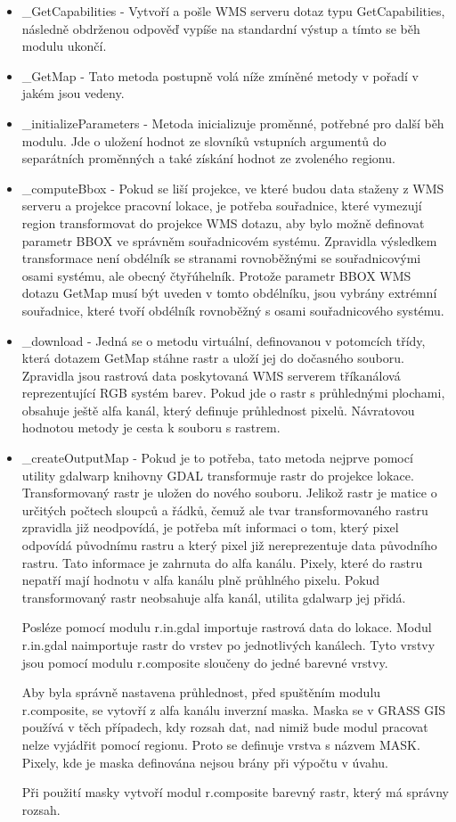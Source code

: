 \documentclass[a4paper,12pt]{article}
\begin{document}
\begin{itemize}
  \item \_GetCapabilities - Vytvoří a pošle WMS serveru dotaz typu GetCapabilities, následně obdrženou odpověď vypíše na standardní výstup a tímto se běh modulu ukončí. 
  \item \_GetMap - Tato metoda postupně volá níže zmíněné metody v pořadí v jakém jsou vedeny. 
  \item \_initializeParameters - Metoda inicializuje proměnné, potřebné pro další běh modulu. Jde o uložení hodnot ze slovníků vstupních argumentů do separátních proměnných a také získání hodnot ze zvoleného regionu.
  \item \_computeBbox - Pokud se liší projekce, ve které budou data staženy z WMS serveru a projekce pracovní lokace, je potřeba souřadnice, které vymezují region transformovat do projekce WMS dotazu, aby bylo možně definovat parametr BBOX ve správněm souřadnicovém systému.
                        Zpravidla výsledkem transformace není obdélník se stranami rovnoběžnými se souřadnicovými osami systému, ale obecný čtyřúhelník. Protože parametr BBOX WMS dotazu GetMap  musí být uveden  v tomto obdélníku, jsou vybrány extrémní souřadnice, které tvoří obdélník rovnoběžný s osami souřadnicového systému.      
  \item \_download - Jedná se o metodu virtuální, definovanou v potomcích třídy, která dotazem GetMap stáhne rastr a uloží jej do dočasného souboru. Zpravidla jsou rastrová data poskytovaná WMS serverem tříkanálová reprezentující RGB systém barev. Pokud jde o rastr s průhlednými plochami, obsahuje ještě alfa kanál, který definuje průhlednost pixelů. Návratovou hodnotou metody je cesta k souboru s rastrem.
  \item \_createOutputMap - Pokud je to potřeba, tato metoda nejprve pomocí utility gdalwarp knihovny GDAL transformuje rastr do projekce lokace. Transformovaný rastr je uložen do nového souboru. 
                            Jelikož rastr je matice o určitých počtech sloupců a řádků, čemuž ale tvar transformovaného rastru zpravidla již neodpovídá, je potřeba mít informaci o tom, který pixel odpovídá původnímu rastru 
                            a který pixel již nereprezentuje data původního rastru. Tato informace je zahrnuta do alfa kanálu. Pixely, které do rastru nepatří mají hodnotu v alfa kanálu plně průhlného pixelu.  Pokud transformovaný rastr neobsahuje alfa kanál, utilita gdalwarp jej přidá.

Posléze pomocí modulu r.in.gdal importuje rastrová data do lokace.
Modul r.in.gdal naimportuje rastr do vrstev po jednotlivých kanálech. Tyto vrstvy jsou pomocí modulu  r.composite sloučeny do jedné barevné vrstvy. 

Aby byla správně nastavena průhlednost, před spuštěním modulu r.composite, se vytovří z alfa kanálu inverzní maska. Maska se v GRASS GIS používá v těch případech, kdy rozsah dat, nad nimiž bude modul pracovat nelze vyjádřit pomocí regionu. Proto se definuje vrstva s názvem MASK. Pixely, kde je maska definována 
nejsou brány při výpočtu v úvahu. 

Při použití masky vytvoří modul r.composite barevný rastr, který má správny rozsah.

\end{itemize}
\end{document}
